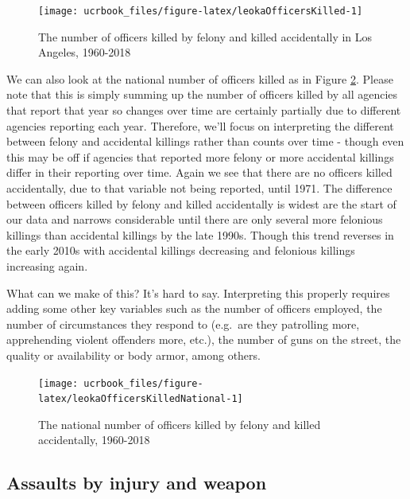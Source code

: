 \documentclass[
  12pt,
  openany]{book}
\begin{document}
\begin{figure}

{\centering \texttt{[image: ucrbook\_files/figure-latex/leokaOfficersKilled-1]} 

}

\caption{The number of officers killed by felony and killed accidentally in Los Angeles, 1960-2018}\label{fig:leokaOfficersKilled}
\end{figure}

We can also look at the national number of officers killed as in Figure \ref{fig:leokaOfficersKilledNational}. Please note that this is simply summing up the number of officers killed by all agencies that report that year so changes over time are certainly partially due to different agencies reporting each year. Therefore, we'll focus on interpreting the different between felony and accidental killings rather than counts over time - though even this may be off if agencies that reported more felony or more accidental killings differ in their reporting over time. Again we see that there are no officers killed accidentally, due to that variable not being reported, until 1971. The difference between officers killed by felony and killed accidentally is widest are the start of our data and narrows considerable until there are only several more felonious killings than accidental killings by the late 1990s. Though this trend reverses in the early 2010s with accidental killings decreasing and felonious killings increasing again.

What can we make of this? It's hard to say. Interpreting this properly requires adding some other key variables such as the number of officers employed, the number of circumstances they respond to (e.g.~are they patrolling more, apprehending violent offenders more, etc.), the number of guns on the street, the quality or availability or body armor, among others.

\begin{figure}

{\centering \texttt{[image: ucrbook\_files/figure-latex/leokaOfficersKilledNational-1]} 

}

\caption{The national number of officers killed by felony and killed accidentally, 1960-2018}\label{fig:leokaOfficersKilledNational}
\end{figure}

\hypertarget{assaults-by-injury-and-weapon}{%
\subsection{Assaults by injury and weapon}\label{assaults-by-injury-and-weapon}}
\end{document}
